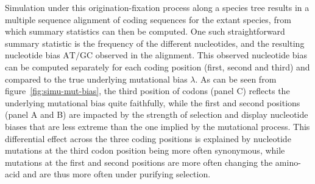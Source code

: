 \documentclass{article}
\newcommand{\atgc}{\text{AT/GC}}
\begin{document}
Simulation under this origination-fixation process along a species tree results in a multiple sequence alignment of coding sequences for the extant species, from which summary statistics can then be computed.
One such straightforward summary statistic is the frequency of the different nucleotides, and the resulting nucleotide bias $\atgc$ observed in the alignment.
This observed nucleotide bias can be computed separately for each coding position (first, second and third) and compared to the true underlying mutational bias $\lambda$.
As can be seen from figure~\ref{fig:simu-mut-bias}, the third position of codons (panel C) reflects the underlying mutational bias quite faithfully, while the first and second positions (panel A and B) are impacted by the strength of selection and display nucleotide biases that are less extreme than the one implied by the mutational process.
This differential effect across the three coding positions is explained by nucleotide mutations at the third codon position being more often {synonymous}, while mutations at the first and second positions are more often changing the amino-acid and are thus more often under purifying selection.
\end{document}
